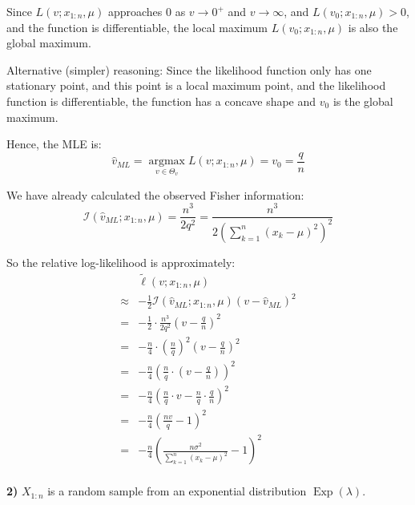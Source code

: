 \documentclass{article}
\begin{document}
\begin{ssolution}
Since \(L(v;x_{1:n},\mu)\) approaches \(0\) as \(v\to 0^+\) and \(v\to \infty\), and \(L(v_0;x_{1:n},\mu) > 0\),
and the function is differentiable,
the local maximum \(L(v_0;x_{1:n},\mu)\) is also the global maximum.

Alternative (simpler) reasoning:
Since the likelihood function only has one stationary point, and this point is a local maximum point, and
the likelihood function is differentiable, the function has a concave shape and \(v_0\) is the global maximum.

Hence, the MLE is:
\[\hat{v}_{ML} = \operatorname*{argmax}_{v\in \Theta_v} L(v;x_{1:n},\mu) = v_0 = \frac{q}{n}\]

We have already calculated the observed Fisher information:
\[\mathcal{I}(\hat{v}_{ML};x_{1:n},\mu) = \frac{n^3}{2q^2} = \frac{n^3}{2\left(\sum_{k=1}^n (x_k-\mu)^2\right)^2}\]

So the relative log-likelihood is approximately:
\begin{align*}
	& \tilde{\ell}(v;x_{1:n},\mu) \\
	\approx& -\frac{1}{2}\mathcal{I}(\hat{v}_{ML};x_{1:n},\mu)(v-\hat{v}_{ML})^2 \\
	=& -\frac{1}{2}\cdot \frac{n^3}{2q^2} (v-\frac{q}{n})^2 \\
	=& -\frac{n}{4}\cdot \left(\frac{n}{q}\right)^2 (v-\frac{q}{n})^2 \\
	=& -\frac{n}{4}(\frac{n}{q}\cdot(v-\frac{q}{n}))^2 \\
	=& -\frac{n}{4}(\frac{n}{q}\cdot v-\frac{n}{q}\cdot\frac{q}{n})^2 \\
	=& -\frac{n}{4}(\frac{nv}{q}-1)^2 \\
	=& -\frac{n}{4}\left(\frac{n\sigma^2}{\sum_{k=1}^n (x_k-\mu)^2}-1\right)^2 \\
\end{align*}
\end{ssolution}

\begin{ssubproblem}
\textbf{2)} \(X_{1:n}\) is a random sample from an exponential distribution
\(\operatorname{Exp}(\lambda)\).
\end{ssubproblem}
\end{document}
